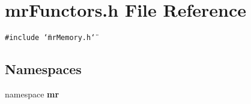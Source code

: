 \section{mr\-Functors.h File Reference}
\label{mrFunctors_8h}
{\tt \#include \char`\"{}mr\-Memory.h\char`\"{}}\par
\subsection*{Namespaces}
\begin{CompactItemize}
\item 
namespace {\bf mr}
\end{CompactItemize}

